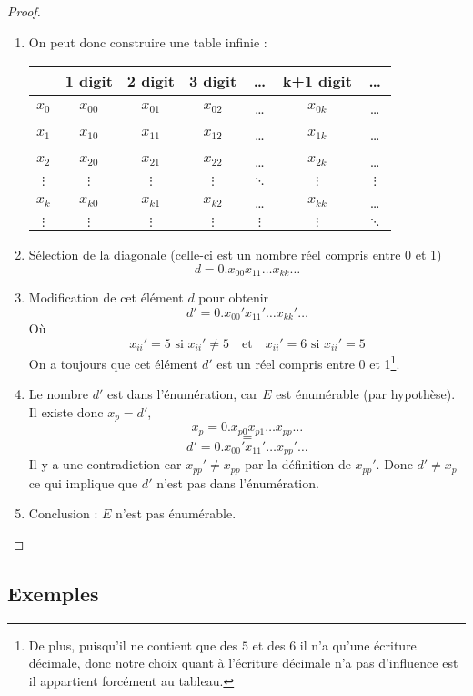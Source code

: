 \begin{mytheo}
\begin{proof}
		\begin{enumerate}
			\item On peut donc construire une table infinie : \\
				\begin{tabular}{|c||c|c|c|c|c|c|}
					\hline
					& 1 digit & 2 digit & 3 digit & \dots & k+1 digit & \dots \\
					\hline
					$x_0$ & $x_{00}$ & $x_{01}$ & $x_{02}$ & \dots & $x_{0k}$ & \dots \\
					$x_1$ & $x_{10}$ & $x_{11}$ & $x_{12}$ & \dots & $x_{1k}$ & \dots \\
					$x_2$ & $x_{20}$ & $x_{21}$ & $x_{22}$ & \dots & $x_{2k}$ & \dots \\
					$\vdots$& $\vdots$& $\vdots$& $\vdots$& $\ddots$& $\vdots$& $\vdots$\\
					$x_k$ & $x_{k0}$ & $x_{k1}$ & $x_{k2}$ & \dots & $x_{kk}$ & \dots \\
					$\vdots$& $\vdots$& $\vdots$& $\vdots$& $\vdots$& $\vdots$& $\ddots$\\
					\hline
				\end{tabular}
			\item Sélection de la diagonale (celle-ci est un nombre réel compris
				entre 0 et 1)
				\[ d=0.x_{00}x_{11}\dots x_{kk}\dots \]
			\item Modification de cet élément $d$ pour obtenir
				\[ d'=0.x_{00}'x_{11}'\dots x_{kk}'\dots \]
				Où
                $$x_{ii}'=5\text{ si }x_{ii}'\neq 5\quad\text{et}\quad x_{ii}'=6\text{ si }x_{ii}'= 5$$
				On a toujours que cet élément $d'$ est un réel compris entre 0 et 1\footnote{De plus, puisqu'il ne contient que des $5$ et des $6$ il n'a qu'une écriture décimale, donc notre choix quant à l'écriture décimale n'a pas d'influence est il appartient forcément au tableau.}.
			\item Le nombre $d'$ est dans l'énumération, car $E$ est
				énumérable (par hypothèse). Il existe donc $x_p=d'$,
				\[ x_p=0.x_{p0}x_{p1}\dots x_{pp}\dots \]
				\[=\]
				\[ d'=0.x_{00}'x_{11}'\dots x_{pp}'\dots \]
				Il y a une contradiction car $x_{pp}' \neq
			       	x_{pp}$ par la définition de $x_{pp}'$. Donc $d' \neq x_p$ ce qui implique que $d'$ n'est pas
				dans l'énumération.
			\item Conclusion : $E$ n'est pas énumérable.		
		\end{enumerate}
	\end{proof}
\end{mytheo}

\subsection{Exemples}
\label{subsec:exemples_non_enum}

